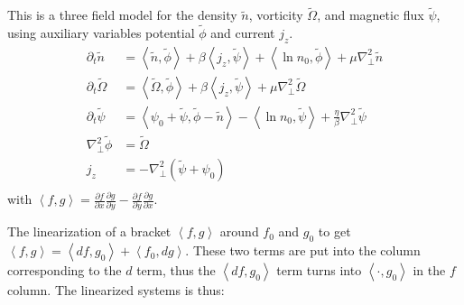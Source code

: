 \documentclass[10pt]{article}
\begin{document}

This is a three field model for the density $\tilde n$, vorticity $\tilde\Omega$, and magnetic flux $\tilde\psi$, using auxiliary variables potential $\tilde\phi$ and current $j_z$.
\begin{equation}
  \begin{aligned}
    \partial_t \tilde n       &= \left\langle \tilde n, \tilde\phi \right\rangle + \beta \left\langle j_z, \tilde\psi \right\rangle + \left\langle \ln n_0, \tilde\phi \right\rangle + \mu \nabla^2_\perp \tilde n \\
  \partial_t \tilde\Omega   &= \left\langle \tilde\Omega, \tilde\phi \right\rangle + \beta \left\langle j_z, \tilde\psi \right\rangle + \mu \nabla^2_\perp \tilde\Omega \\
  \partial_t \tilde\psi     &= \left\langle \psi_0 + \tilde\psi, \tilde\phi - \tilde n \right\rangle - \left\langle \ln n_0, \tilde\psi \right\rangle + \frac{\eta}{\beta} \nabla^2_\perp \tilde\psi \\
  \nabla^2_\perp\tilde\phi        &= \tilde\Omega \\
  j_z  &= -\nabla^2_\perp  \left(\tilde\psi + \psi_0  \right)\\
  \end{aligned}
\end{equation}
with $\left\langle f, g \right\rangle = \frac{\partial f}{\partial x}\frac{\partial g}{\partial y} - \frac{\partial f}{\partial y}\frac{\partial g}{\partial x}$.

The linearization of a bracket $\left\langle f, g \right\rangle$ around $f_0$ and $g_0$ to get $\left\langle f, g \right\rangle  = \left\langle d f, g_0 \right\rangle + \left\langle f_0, d g \right\rangle$.
These two terms are put into the column corresponding to the $d$ term, thus the $\left\langle d f, g_0 \right\rangle$ term turns into $\left\langle \cdot, g_0 \right\rangle$ in the $f$ column. The linearized systems is thus:
\end{document}
